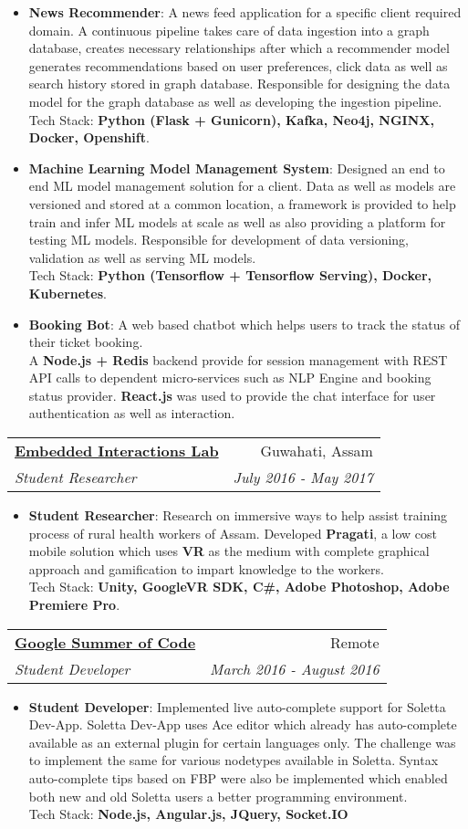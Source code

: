 \documentclass[letterpaper,11pt]{article}
\makeatletter
\newcommand{\resumeItem}[2]{
  \item\small{
    \textbf{#1}{: #2 \vspace{-2pt}}
  }
}
\newcommand{\resumeSubheading}[4]{
  \vspace{-1pt}\item
    \begin{tabular*}{0.97\textwidth}[t]{l@{\extracolsep{\fill}}r}
      \textbf{#1} & #2 \\
      \textit{\small#3} & \textit{\small #4} \\
    \end{tabular*}\vspace{-5pt}
}
\newcommand{\resumeItemListStart}{\begin{itemize}}
\newcommand{\resumeItemListEnd}{\end{itemize}\vspace{-5pt}}
\makeatother
\begin{document}
      \resumeItemListStart
        \resumeItem{News Recommender}
          {A news feed application for a specific client required domain. A continuous pipeline takes care of data ingestion into a graph database, creates necessary relationships after which a recommender model generates recommendations based on user preferences, click data as well as search history stored in graph database. Responsible for designing the data model for the graph database as well as developing the ingestion pipeline. \\Tech Stack: \textbf{Python (Flask + Gunicorn), Kafka, Neo4j, NGINX, Docker, Openshift}.}
        \resumeItem{Machine Learning Model Management System}
          {Designed an end to end ML model management solution for a client. Data as well as models are versioned and stored at a common location, a framework is provided to help train and infer ML models at scale as well as also providing a platform for testing ML models. Responsible for development of data versioning, validation as well as serving ML models. \\Tech Stack: \textbf{Python (Tensorflow + Tensorflow Serving), Docker, Kubernetes}.}
         \resumeItem{Booking Bot}
          {A web based chatbot which helps users to track the status of their ticket booking. \\ A \textbf{Node.js + Redis} backend provide for session management with REST API calls to dependent micro-services such as NLP Engine and booking status provider. \textbf{React.js} was used to provide the chat interface for user authentication as well as interaction.}
      \resumeItemListEnd

    \resumeSubheading
      {\href{http://www.embeddedinteractions.com/project39.html}{Embedded Interactions Lab}}{Guwahati, Assam}
      {Student Researcher}{July 2016 - May 2017}
      \resumeItemListStart
        \resumeItem{Student Researcher}
          {Research on immersive ways to help assist training process of rural health workers of Assam. Developed \textbf{Pragati}, a low cost mobile solution which uses \textbf{VR} as the medium with complete graphical approach and gamification to impart knowledge to the workers. \\Tech Stack: \textbf{Unity, GoogleVR SDK, C\#, Adobe Photoshop, Adobe Premiere Pro}.}
      \resumeItemListEnd
     
     \resumeSubheading
      {\href{https://summerofcode.withgoogle.com/archive/2016/projects/4536824152195072/}{Google Summer of Code}}{Remote}
      {Student Developer}{March 2016 - August 2016}
      \resumeItemListStart
       \resumeItem{Student Developer}
         {Implemented live auto-complete support for Soletta Dev-App. Soletta Dev-App uses Ace editor which already has auto-complete available as an external plugin for certain languages only. The challenge was to implement the same for various nodetypes available in Soletta. Syntax auto-complete tips based on FBP were also be implemented which enabled both new and old Soletta users a better programming environment. \\Tech Stack: \textbf{Node.js, Angular.js, JQuery, Socket.IO}}
        \resumeItemListEnd
\end{document}
